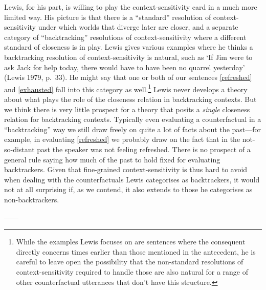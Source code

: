 \documentclass[If.tex]{subfiles}
\begin{document}
\begin{prop}
Lewis, for his part, is willing to play the context-sensitivity card in a much more limited way. His picture is that there is a “standard” resolution of context-sensitivity under which worlds that diverge later are closer, and a separate category of “backtracking” resolutions of context-sensitivity where a different standard of closeness is in play. Lewis gives various examples where he thinks a backtracking resolution of context-sensitivity is natural, such as ‘If Jim were to ask Jack for help today, there would have to have been no quarrel yesterday’ (Lewis 1979, p.~33). He might say that one or both of our sentences \ref{refreshed} and \ref{exhausted} fall into this category as well.\footnote{While the examples Lewis focuses on are sentences where the consequent directly concerns times earlier than those mentioned in the antecedent, he is careful to leave open the possibility that the non-standard resolutions of context-sensitivity required to handle those are also natural for a range of other counterfactual utterances that don't have this structure.} Lewis never develops a theory about what plays the role of the closeness relation in backtracking contexts. But we think there is very little prospect for a theory that posits a \emph{single} closeness relation for backtracking contexts. Typically even evaluating a counterfactual in a “backtracking” way we still draw freely on quite a lot of facts about the past---for example, in evaluating \ref{refreshed} we probably draw on the fact that in the not-so-distant past the speaker was not feeling refreshed. There is no prospect of a general rule saying how much of the past to hold fixed for evaluating backtrackers. Given that fine-grained context-sensitivity is thus hard to avoid when dealing with the counterfactuals Lewis categorises as backtrackers, it would not at all surprising if, as we contend, it also extends to those he categorises as non-backtrackers.

------


\end{prop}
\end{document}
